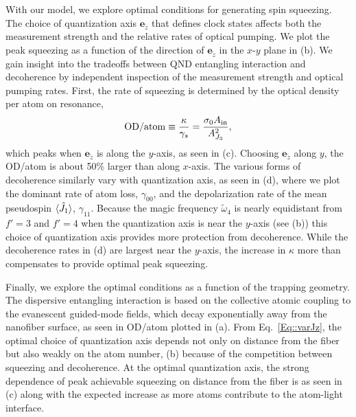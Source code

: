 \documentclass[aps,pra,twocolumn]{revtex4-1} %
\newcommand{\jx}{\hat{J}_1}
\newcommand{\qaxis}{\mathbf{e}_{\tilde{z}}}
\newcommand{\magic}[1]{\tilde{\omega}_{#1}}
\begin{document}
With our model, we explore optimal conditions for generating spin squeezing.   The choice of quantization axis $\qaxis$ that defines clock states affects both the measurement strength and the relative rates of optical pumping. We plot the peak squeezing as a function of the direction of $\qaxis$ in the $x$-$y$ plane in (b). 
We gain insight into the tradeoffs between QND entangling interaction and decoherence by independent inspection of the measurement strength and optical pumping rates.  
First, the rate of squeezing is determined by the optical density per atom on resonance,
\begin{align}\label{Eq::OD/atom}
\mathrm{OD}/\mathrm{atom} \equiv \frac{\kappa}{\gamma_s}=\frac{\sigma_0 A_{\rm in}}{A_{J_3}^2},
\end{align} 
which peaks when $\qaxis$ is along the $y$-axis, as seen in (c). 
Choosing $\qaxis$ along $y$, the OD/atom is about 50\% larger than along $x$-axis.  
The various forms of decoherence similarly vary with quantization axis, as seen in (d), where we plot the dominant rate of atom loss, $\gamma_{00}$, and the depolarization rate of the mean pseudospin $\expt{\jx}$, $\gamma_{11}$. 
Because the magic frequency $\magic{4}$ is nearly equidistant from $f'=3$ and $f'=4$ when the quantization  axis is near the $y$-axis (see (b)) this choice of quantization axis provides more protection from decoherence.   
While the decoherence rates in (d) are largest near the $y$-axis, the increase in $\kappa$ more than compensates to provide optimal peak squeezing.

Finally, we explore the optimal conditions as a function of the trapping geometry.  
The dispersive entangling interaction is based on the collective atomic coupling to the evanescent guided-mode fields, which decay exponentially away from the nanofiber surface, as seen in OD/atom plotted in (a). 
From Eq.~\eqref{Eq::varJz}, the optimal choice of quantization axis depends not only on distance from the fiber but also weakly on the atom number, (b) because of the competition between squeezing and decoherence.  
At the optimal quantization axis, the strong dependence of peak achievable squeezing on distance from the fiber is as seen in (c) along with the expected increase as more atoms contribute to the atom-light interface.  
\end{document}
